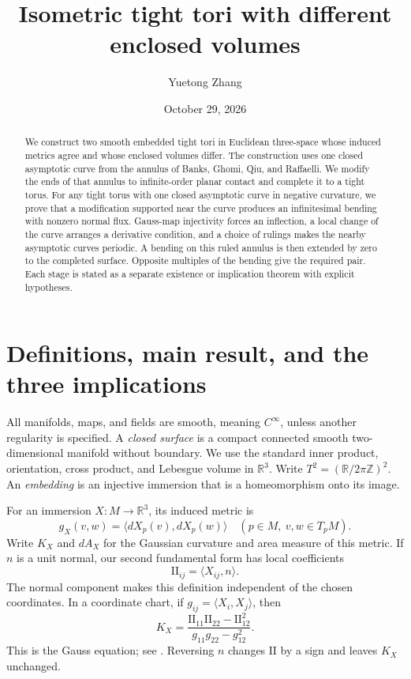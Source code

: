 \documentclass[11pt]{amsart}
\title{Isometric tight tori with different enclosed volumes}
\author{Yuetong Zhang}
\date{October 29, 2026}
\theoremstyle{definition}
\newcommand{\R}{\mathbb R}
\begin{document}
\begin{abstract}
We construct two smooth embedded tight tori in Euclidean three-space
whose induced metrics agree and whose enclosed volumes differ. The
construction uses one closed asymptotic curve from the annulus of
Banks, Ghomi, Qiu, and Raffaelli. We modify the ends of that annulus
to infinite-order planar contact and complete it to a tight torus.
For any tight torus with one closed asymptotic curve in negative
curvature, we prove that a modification supported near the curve
produces an infinitesimal bending with nonzero normal flux.
Gauss-map injectivity forces an inflection, a local change of the curve
arranges a derivative condition, and a choice of rulings makes the
nearby asymptotic curves periodic. A bending on this ruled annulus is
then extended by zero to the completed surface. Opposite multiples of
the bending give the required pair. Each stage is stated as a separate
existence or implication theorem with explicit hypotheses.
\end{abstract}
\maketitle

\section{Definitions, main result, and the three implications}

All manifolds, maps, and fields are smooth, meaning $C^\infty$, unless
another regularity is specified. A \emph{closed surface} is a compact
connected smooth two-dimensional manifold without boundary. We use
the standard inner product, orientation, cross product, and Lebesgue
volume in $\R^3$. Write $T^2=(\R/2\pi\mathbb Z)^2$.
An \emph{embedding} is an injective immersion that is a homeomorphism
onto its image.

For an immersion $X:M\to\R^3$, its induced metric is
\[
 g_X(v,w)=\langle dX_p(v),dX_p(w)\rangle
 \quad (p\in M,\ v,w\in T_pM).
\]
Write $K_X$ and $dA_X$ for the Gaussian curvature and area measure of
this metric. If $n$ is a unit normal, our second fundamental form has
local coefficients
\[
 \mathrm{II}_{ij}=\langle X_{ij},n\rangle.
\]
The normal component makes this definition independent of the chosen
coordinates. In a coordinate chart, if $g_{ij}=\langle X_i,X_j\rangle$,
then
\begin{equation}\label{eq:gauss-curvature}
 K_X=\frac{\mathrm{II}_{11}\mathrm{II}_{22}
                 -\mathrm{II}_{12}^2}{g_{11}g_{22}-g_{12}^2}.
\end{equation}
This is the Gauss equation; see \cite[\S3-3 and \S4-3]{doCarmo}.
Reversing $n$ changes $\mathrm{II}$ by a sign and leaves $K_X$ unchanged.
\end{document}
